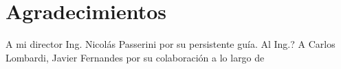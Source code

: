 
\section{Agradecimientos}

A mi director Ing. Nicolás Passerini por su persistente guía. Al Ing.? 
A Carlos Lombardi, Javier Fernandes por su colaboración a lo largo de 
